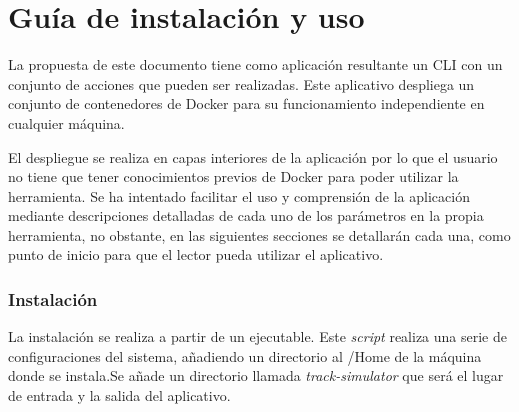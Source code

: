 
\chapter{Guía de instalación y uso} \label{chapter:GuiaUso}
La propuesta de este documento tiene como aplicación resultante un \ac{CLI} con un conjunto de acciones que pueden ser realizadas. Este aplicativo despliega un conjunto de contenedores de Docker para su funcionamiento independiente en cualquier máquina. 

El despliegue se realiza en capas interiores de la aplicación por lo que el usuario no tiene que tener conocimientos previos de Docker para poder utilizar la herramienta. Se ha intentado facilitar el uso y comprensión de la aplicación mediante descripciones detalladas de cada uno de los parámetros en la propia herramienta, no obstante, en las siguientes secciones se detallarán cada una, como punto de inicio para que el lector pueda utilizar el aplicativo.

\subsection{Instalación}
La instalación se realiza a partir de un ejecutable. Este \textit{script} realiza una serie de configuraciones del sistema, añadiendo un directorio al \slash Home de la máquina donde se instala.Se añade un directorio llamada \textit{track-simulator} que será el lugar de entrada y la salida del aplicativo. 

